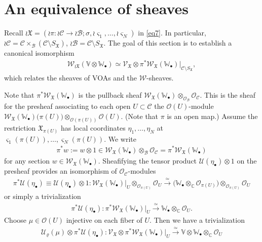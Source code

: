 \documentclass[12pt,a4paper,notitlepage]{article}
\theoremstyle{definition}
\theoremstyle{plain}
\newcommand{\fk}{\mathfrak}
\newcommand{\mc}{\mathcal}
\newcommand{\scr}{\mathscr}
\newcommand{\sgm}{\varsigma}
\newcommand{\SX}{{S_{\fk X}}}
\newcommand{\blt}{\bullet}
\newcommand{\Vbb}{\mathbb V}
\newcommand{\Wbb}{\mathbb W}
\newcommand{\Cbb}{\mathbb C}
\numberwithin{equation}{section}
\begin{document}
\section{An equivalence of sheaves}\label{lb15}




Recall $\wr\fk X=(\wr\pi:\wr\mc C\rightarrow\wr\mc B;\sigma,\wr\sgm_1,\dots,\wr\sgm_N)$ in \eqref{eq7}. In particular, $\wr\mc C=\mc C\times_{\mc B}(\mc C\setminus\SX)$, $\wr\mc B=\mc C\setminus\SX$. The goal of this section is to establish a canonical isomorphism
\begin{align*}
\scr W_{\wr\fk X}(\Vbb\otimes\Wbb_\blt)\simeq	\scr V_{\fk X}\otimes\pi^*\scr W_{\fk X}(\Wbb_\blt)|_{\mc C\setminus\SX},
\end{align*}
which relates the sheaves of VOAs and the $\scr W$-sheaves.

Note that $\pi^*\scr W_{\fk X}(\Wbb_\blt)$ is the pullback sheaf $\scr W_{\fk X}(\Wbb_\blt)\otimes_{\scr O_{\mc B}}\scr O_{\mc C}$. This is the sheaf for the presheaf associating to each open $U\subset\mc C$ the $\scr O(U)$-module $\scr W_{\fk X}(\Wbb_\blt)\big(\pi(U)\big)\otimes_{\scr O(\pi(U))}\scr O(U)$. (Note that $\pi$ is an open map.)  Assume the restriction $\fk X_{\pi(U)}$ has local coordinates $\eta_1,\dots,\eta_N$ at $\sgm_1(\pi(U)),\dots,\sgm_N(\pi(U))$. We write
\begin{align*}
\pi^* w:=w\otimes 1\in\scr W_{\fk X}(\Wbb_\blt)\otimes_{\mc B}\scr O_{\mc C}=\pi^*\scr W_{\fk X}(\Wbb_\blt)	
\end{align*}
for any section $w\in\scr W_{\fk X}(\Wbb_\blt)$. Sheafifying the tensor product $\mc U(\eta_\blt)\otimes 1$ on the presheaf provides an isomorphism of $\scr O_{\mc C}$-modules \index{Uzz@$\pi^*\mc U(\eta_\blt)$}
\begin{align}
\pi^*\mc U(\eta_\blt)\equiv \mc U(\eta_\blt)\otimes 1:\scr W_{\fk X}(\Wbb_\blt)\big|_U\otimes_{\scr O_{\pi(U)}}\scr O_U\xrightarrow{\simeq}\Big(\Wbb_\blt\otimes_\Cbb\scr O_{\pi(U)}\Big)\otimes_{\scr O_{\pi(U)}}\scr O_U\label{eq13}
\end{align}
or simply a trivialization
\begin{align}
\pi^*\mc U(\eta_\blt):\pi^*\scr W_{\fk X}(\Wbb_\blt)\big|_U\xrightarrow{\simeq}\Wbb_\blt\otimes_\Cbb\scr O_U.	
\end{align}
Choose $\mu\in\scr O(U)$ injective on each fiber of $U$. Then we have a trivialization
\begin{align}
\boxed{~\mc U_\varrho(\mu)\otimes\pi^*\mc U(\eta_\blt):	\scr V_{\fk X}\otimes\pi^*\scr W_{\fk X}(\Wbb_\blt)\big|_U\xrightarrow{\simeq}\Vbb\otimes\Wbb_\blt\otimes_\Cbb\scr O_U~}\label{eq16}
\end{align}
\end{document}
